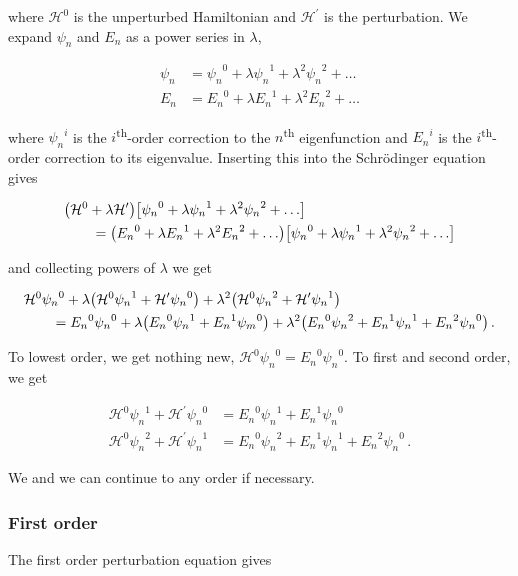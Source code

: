 \documentclass[12pt, titlepage]{article}
\begin{document}
where $\mathcal{H}^0$ is the unperturbed Hamiltonian and $\mathcal{H}^{\prime}$ is the perturbation. We expand $\psi_n$ and $E_n$ as a power series in $\lambda$,

\begin{align}
	\psi_n &= {\psi_n}^0 + \lambda{\psi_n}^{1} + \lambda^2{\psi_n}^2 + \ldots \\[4pt]
	E_n &= {E_n}^0 + \lambda{E_n}^{1} + \lambda^2{E_n}^2 + \ldots
\end{align}

where ${\psi_n}^{i}$ is the $i$\textsuperscript{th}-order correction to the $n$\textsuperscript{th} eigenfunction and ${E_n}^{i}$ is the $i$\textsuperscript{th}-order correction to its eigenvalue. Inserting this into the Schrödinger equation gives

\begin{align*}
	&\qty(\mathcal{H}^0+\lambda\mathcal{H}^{\prime})\qty[{\psi_n}^0 + \lambda{\psi_n}^{1} + \lambda^2{\psi_n}^{2} + \ldots] \\ &\qquad = \qty({E_n}^{0} + \lambda{E_n}^{1} + \lambda^2{E_n}^{2} + \ldots)\qty[{\psi_n}^0 + \lambda{\psi_n}^{1} + \lambda^2{\psi_n}^{2} + \ldots]
\end{align*}

and collecting powers of $\lambda$ we get

\begin{align*}
	&\mathcal{H}^0{\psi_n}^0 + \lambda\qty(\mathcal{H}^0{\psi_n}^1 + \mathcal{H}^{\prime}{\psi_n}^{0}) + \lambda^2\qty(\mathcal{H}^0{\psi_n}^2 + \mathcal{H}^{\prime}{\psi_n}^{1}) \\ &\qquad = {E_n}^0{\psi_n}^0 + \lambda\qty({E_n}^0{\psi_n}^1 + {E_n}^1{\psi_m}^0) + \lambda^2\qty({E_n}^0{\psi_n}^2 + {E_n}^1{\psi_n}^1 + {E_n}^2{\psi_n}^0) \,.
\end{align*}

To lowest order, we get nothing new, $\mathcal{H}^0{\psi_n}^0 = {E_n}^0{\psi_n}^0$. To first and second order, we get

\begin{align}
	\mathcal{H}^0{\psi_n}^1 + \mathcal{H}^{\prime}{\psi_n}^0 &= {E_n}^0{\psi_n}^1 + {E_n}^1{\psi_n}^0 \\[4pt]	\mathcal{H}^0{\psi_n}^2 + \mathcal{H}^{\prime}{\psi_n}^1 &= {E_n}^0{\psi_n}^2 + {E_n}^1{\psi_n}^1 + {E_n}^2{\psi_n}^0 \,.
\end{align}

We and we can continue to any order if necessary.

\subsubsection{First order}
The first order perturbation equation gives
\end{document}
